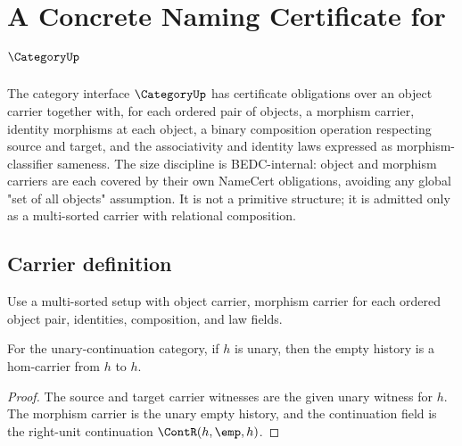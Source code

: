 \chapter{A Concrete Naming Certificate for \(\CategoryUp\)}
\label{ch:concrete-instances-category-namecert}

The category interface \(\CategoryUp\) has certificate obligations over an object carrier together with, for each ordered pair of objects, a morphism carrier, identity morphisms at each object, a binary composition operation respecting source and target, and the associativity and identity laws expressed as morphism-classifier sameness. The size discipline is BEDC-internal: object and morphism carriers are each covered by their own NameCert obligations, avoiding any global "set of all objects" assumption. It is not a primitive structure; it is admitted only as a multi-sorted carrier with relational composition.

\section{Carrier definition}

\begin{definition}
\label{def:category-carrier}
Use a multi-sorted setup with object carrier, morphism carrier for each ordered object pair, identities, composition, and law fields.
\end{definition}

\begin{theorem}
\label{thm:category-hom-carrier-empty-identity}
For the unary-continuation category, if \(h\) is unary, then the empty history
is a hom-carrier from \(h\) to \(h\).
\end{theorem}
\begin{proof}
The source and target carrier witnesses are the given unary witness for \(h\).
The morphism carrier is the unary empty history, and the continuation field is
the right-unit continuation \(\ContR(h,\emp,h)\).
\end{proof}

